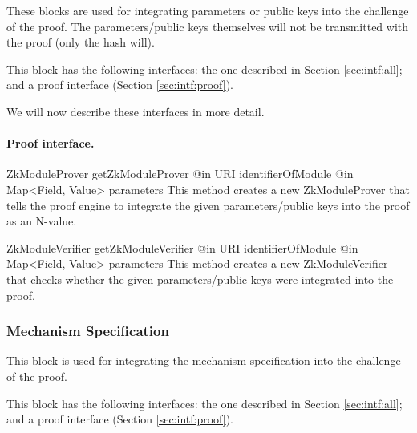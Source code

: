     These blocks are used for integrating parameters or public keys into the
    challenge of the proof. 
    The parameters/public keys themselves will not be transmitted
    with the proof (only the hash will).

    This block has the following interfaces:
    the one described in Section \ref{sec:intf:all};
    and a proof interface (Section \ref{sec:intf:proof}).

    We will now describe these interfaces in more detail.

    \paragraph{Proof interface.}
      \begin{method}
      {ZkModuleProver}
      {getZkModuleProver}
      {
        {@in URI identifierOfModule}
        {@in Map<Field, Value> parameters}
      }
      This method creates a new ZkModuleProver that tells the proof engine to
      integrate the given parameters/public keys into the proof as an N-value.
      \end{method}
      \begin{method}
      {ZkModuleVerifier}
      {getZkModuleVerifier}
      {
        {@in URI identifierOfModule}
        {@in Map<Field, Value> parameters}
      }
      This method creates a new ZkModuleVerifier that checks whether the
      given parameters/public keys were integrated into the proof.
      \end{method}

    \subsubsection{Mechanism Specification}

    This block is used for integrating the mechanism specification into the
    challenge of the proof.

    This block has the following interfaces:
    the one described in Section \ref{sec:intf:all};
    and a proof interface (Section \ref{sec:intf:proof}).

